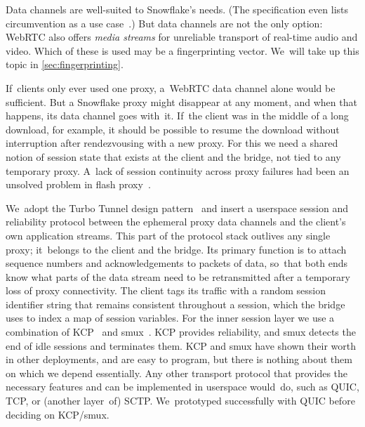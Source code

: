 \documentclass[letterpaper,twocolumn]{article}
\newcommand{\firstterm}[1]{\textit{#1}}
\begin{document}
Data channels are well-suited to Snowflake's needs.
(The specification even lists circumvention as a use case~\cite[\S 3.2]{rfc8831}.)
But data channels are not the only option:
WebRTC also offers \firstterm{media streams}
for unreliable transport of real-time audio and video.
Which of these is used may be a fingerprinting vector.
We~will take up this topic in \autoref{sec:fingerprinting}.

If~clients only ever used one proxy,
a~WebRTC data channel alone would be sufficient.
But a Snowflake proxy might
disappear at any moment,
and when that happens, its data channel goes with~it.
If~the client was in the middle of a long download,
for example, it should be possible to resume the download
without interruption after rendezvousing with a new proxy.
For this we need a shared notion of session state that exists
at the client and the bridge, not tied to any temporary proxy.
A~lack of session continuity across proxy failures
had been an unsolved problem in flash proxy~\cite[\S 5.2]{Fifield2012a}.

We~adopt the
Turbo Tunnel design pattern~\cite{Fifield2020a}
and insert a userspace
session and reliability protocol
between the ephemeral proxy data channels
and the client's own application streams.
This part of the protocol stack
outlives any single proxy; it~belongs to
the client and the bridge.
Its primary function is to attach sequence numbers and acknowledgements
to packets of data,
so~that both ends know what parts of the data stream
need to be retransmitted after a temporary loss of proxy connectivity.
The client tags its traffic
with a random session identifier string that remains
consistent throughout a session,
which the bridge uses to index a map of session variables.
For the inner session layer we use a combination of
KCP~\cite{kcp} and
smux~\cite{smux}.
KCP provides reliability,
and smux detects the end of idle sessions and terminates them.
KCP and smux have shown their worth in other deployments,
and are easy to program,
but there is nothing about them on which we depend essentially.
Any other transport protocol that provides the necessary features
and can be implemented in userspace would~do,
such as QUIC, TCP, or (another layer~of) SCTP.
We~prototyped successfully with QUIC before deciding on KCP/\allowbreak smux.

%
\end{document}
